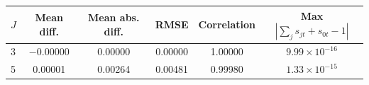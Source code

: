 \begin{tabular}{lccccc}
\toprule
$J$ & Mean diff. & Mean abs. diff. & RMSE & Correlation & Max $|\sum_j s_{jt}+s_{0t}-1|$ \\
\midrule
3 & $-$0.00000 & 0.00000 & 0.00000 & 1.00000 & $9.99\times10^{-16}$ \\
5 & 0.00001 & 0.00264 & 0.00481 & 0.99980 & $1.33\times10^{-15}$ \\
\bottomrule
\end{tabular}
